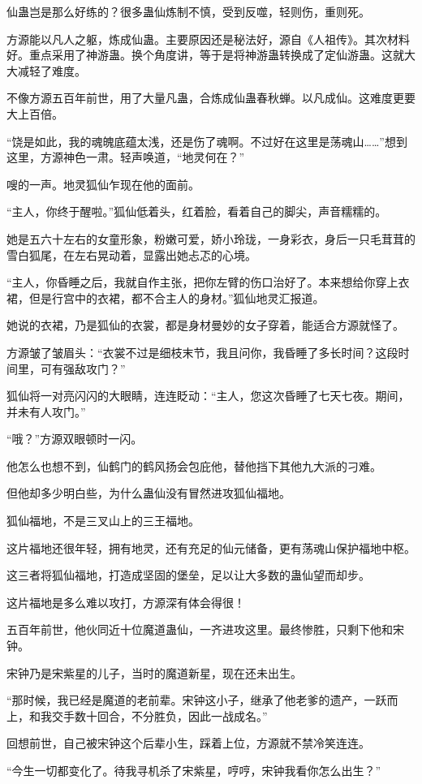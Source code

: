 \begin{this_body}
仙蛊岂是那么好练的？很多蛊仙炼制不慎，受到反噬，轻则伤，重则死。

方源能以凡人之躯，炼成仙蛊。主要原因还是秘法好，源自《人祖传》。其次材料好。重点采用了神游蛊。换个角度讲，等于是将神游蛊转换成了定仙游蛊。这就大大减轻了难度。

不像方源五百年前世，用了大量凡蛊，合炼成仙蛊春秋蝉。以凡成仙。这难度更要大上百倍。

“饶是如此，我的魂魄底蕴太浅，还是伤了魂啊。不过好在这里是荡魂山……”想到这里，方源神色一肃。轻声唤道，“地灵何在？”

嗖的一声。地灵狐仙乍现在他的面前。

“主人，你终于醒啦。”狐仙低着头，红着脸，看着自己的脚尖，声音糯糯的。

她是五六十左右的女童形象，粉嫩可爱，娇小玲珑，一身彩衣，身后一只毛茸茸的雪白狐尾，在左右晃动着，显露出她忐忑的心境。

“主人，你昏睡之后，我就自作主张，把你左臂的伤口治好了。本来想给你穿上衣裙，但是行宫中的衣裙，都不合主人的身材。”狐仙地灵汇报道。

她说的衣裙，乃是狐仙的衣裳，都是身材曼妙的女子穿着，能适合方源就怪了。

方源皱了皱眉头：“衣裳不过是细枝末节，我且问你，我昏睡了多长时间？这段时间里，可有强敌攻门？”

狐仙将一对亮闪闪的大眼睛，连连眨动：“主人，您这次昏睡了七天七夜。期间，并未有人攻门。”

“哦？”方源双眼顿时一闪。

他怎么也想不到，仙鹤门的鹤风扬会包庇他，替他挡下其他九大派的刁难。

但他却多少明白些，为什么蛊仙没有冒然进攻狐仙福地。

狐仙福地，不是三叉山上的三王福地。

这片福地还很年轻，拥有地灵，还有充足的仙元储备，更有荡魂山保护福地中枢。

这三者将狐仙福地，打造成坚固的堡垒，足以让大多数的蛊仙望而却步。

这片福地是多么难以攻打，方源深有体会得很！

五百年前世，他伙同近十位魔道蛊仙，一齐进攻这里。最终惨胜，只剩下他和宋钟。

宋钟乃是宋紫星的儿子，当时的魔道新星，现在还未出生。

“那时候，我已经是魔道的老前辈。宋钟这小子，继承了他老爹的遗产，一跃而上，和我交手数十回合，不分胜负，因此一战成名。”

回想前世，自己被宋钟这个后辈小生，踩着上位，方源就不禁冷笑连连。

“今生一切都变化了。待我寻机杀了宋紫星，哼哼，宋钟我看你怎么出生？”


\end{this_body}
